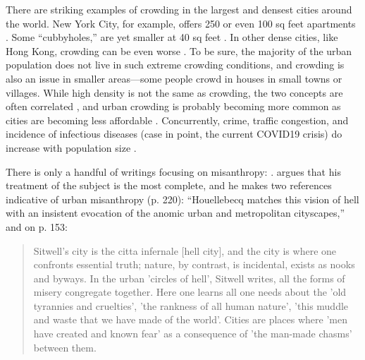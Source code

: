 \documentclass[11pt, letterpaper]{article}
\begin{document}
\begin{spacing}{1.4}
There are striking examples of crowding in the largest and densest cities around
the world. New York City, for example, offers 250 or even 100 sq feet apartments
\citep{abc,yoneda,dailynews}. Some ``cubbyholes,'' are yet smaller at 40 sq feet \citep{newyorktimes}. In other dense cities, like Hong Kong, crowding can be even worse \citep{newyorktimes2}. To
  be sure, the majority of the urban population does not live in such extreme crowding conditions, and crowding is also an issue in smaller areas---some people crowd in houses in small towns or villages.
  While high density is not the same as crowding, the two concepts are often
  correlated \citep{meyer13}, and urban crowding is probably becoming more
  common  as cities are becoming less affordable  \citep[e.g.,][]{misraCL15oct6,floridaCL18apr11,weinbergCL16aug11,solariMISC19apr24,schuetzMISC19may7,kotkin_db_mar20_13}. 
%    
% 
Concurrently,  crime, traffic congestion, and incidence of infectious diseases ({case in point, the current COVID19 crisis}) do increase with population size \citep{bettencourt10,bettencourt10b,bettencourt07}.

There is only a handful of writings focusing on misanthropy: 
\citet{thrift05,melgar13,keeling13,smith97,bloch87,wilson85,ray81,rosenberg57,rosenberg56}.
\citet{gibson17} argues that his treatment of the subject is %
 the most complete, and he makes two references indicative of urban
misanthropy (p. 220): ``Houellebecq matches this vision of hell with an
insistent evocation of the anomic urban and metropolitan cityscapes,'' and on p. 153:

\begin{quote}
  Sitwell's city is the citta infernale [hell city], and the city is where one confronts essential truth; nature, by contrast, is incidental, exists as nooks and byways. In the urban 'circles of hell', Sitwell writes, all the forms of misery congregate together.  Here one learns all one needs about the 'old tyrannies and cruelties', 'the rankness of all human nature', 'this muddle and waste that we have made of the world'. Cities are places where 'men have created and known fear' as a consequence of 'the man-made chasms' between them.
\end{quote}


\end{spacing}
\end{document}
